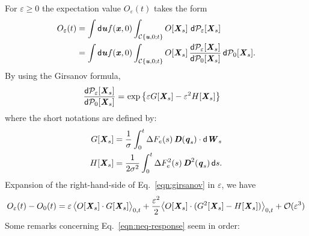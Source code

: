 \documentclass[aip,jcp,a4paper,reprint,onecolumn]{revtex4-1}
\newcommand{\vect}[1]{\textbf{\textit{#1}}}
\newcommand{\dd}{\textsf{d}}
\newcommand{\eps}{\varepsilon}
\newcommand{\mo}{\mathcal O}
\newcommand{\mc}{\mathcal C}
\begin{document}
For $\eps\ge 0$ the  expectation value $O_\eps(t)$ takes the form
\begin{align}
  O_\eps(t) & =
  \int \dd\vect u f(\vect x,0)
  \int_{\mc\{\vect u,0; t\}} O[\vect X_s]\,
  \, \dd\mathcal P_\eps[\vect X_s]   \\
& = \int \dd\vect u f(\vect x,0)
  \int_{\mc\{\vect u,0; t\}} O[\vect X_s]\,
  \frac{\dd {\mathcal P}_\eps[\vect X_s]}{\dd\mathcal P_0[\vect X_s]}
  \, \dd\mathcal P_0[\vect X_s] .   
\end{align}
By using the Girsanov formula, 
\begin{align}\label{eqn:girsanov}
  \frac
  {\dd{\mathcal P_\eps}[\vect X_s]}
  {\dd\mathcal P_0[\vect X_s]}  
  =&\,
  \exp
  \big\{{\eps G[\vect X_s] - \eps^2 H[\vect X_s]}
  \big\}
\end{align}
where the short notations are defined by:
\begin{align}
  G[\vect X_s]
  &= \frac{1}\sigma\int_0^t
  \Delta F_e(s)\,\vect D(\vect q_s)\cdot\dd\vect W_s \\
  H[\vect X_s]
  &=
  \frac 1{2\sigma^2}\int_0^t
  \Delta F_e^2(s)\,\vect D^2(\vect q_s)\,\dd s.
\end{align}
Expansion of the right-hand-side of Eq.~\eqref{eqn:girsanov} in $\eps$, we have
\begin{align}\label{eqn:neq-response}
   O_\eps(t) -
  O_0(t)
  =
  \eps\, \big\langle O[\vect X_s]\cdot G[\vect X_s]\big\rangle_{0,t}
  +
  \frac{\eps^2}{2} \big\langle O[\vect X_s] \cdot (G^2[\vect X_s] - H[\vect X_s] )\big\rangle_{0,t}
  +
  \mo (\eps^3)
\end{align}
Some remarks concerning Eq.~\eqref{eqn:neq-response} seem in order:
\end{document}
